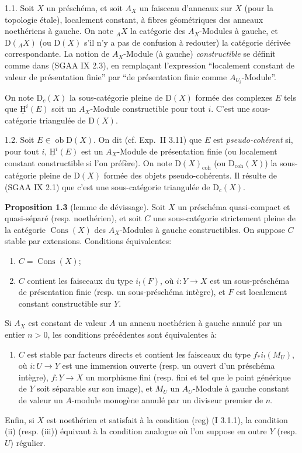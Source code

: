 \documentclass[11pt]{article}
\providecommand{\Cons}{\operatorname{Cons}}
\providecommand{\uH}{\underline{\mathrm H}}
\newcommand{\D}{\mathrm{D}}
\newcommand{\ob}{\operatorname{ob}}
\providecommand{\ob}{\operatorname{ob}}
\begin{document}
1.1. Soit $X$ un préschéma, et soit $A_X$ un faisceau d'anneaux sur $X$ (pour la topologie étale), localement constant, à fibres géométriques des anneaux noethériens à gauche. On note ${}_A X$ la catégorie des $A_X$-Modules à gauche, et $\D({}_A X)$ (ou $\D(X)$ s'il n'y a pas de confusion à redouter) la catégorie dérivée correspondante. La notion de $A_X$-Module (à gauche) \emph{constructible} se définit comme dans (SGAA IX 2.3), en remplaçant l'expression ``localement constant de valeur de présentation finie'' par ``de présentation finie comme $A_{U_i}$-Module''.

On note $\D_c(X)$ la sous-catégorie pleine de $\D(X)$ formée des complexes $E$ tels que $\uH^i(E)$ soit un $A_X$-Module constructible pour tout $i$. C'est une sous-catégorie triangulée de $\D(X)$.

1.2.
Soit $E\in\ob\D(X)$. On dit (cf. Exp.~II 3.11) que $E$ est \emph{pseudo-cohérent} si, pour tout $i$, $\uH^i(E)$ est un $A_X$-Module de présentation finie (ou localement constant constructible si l'on préfère). On note $\D(X)_{\mathrm{coh}}$ (ou $\D_{\mathrm{coh}}(X)$) la sous-catégorie pleine de $\D(X)$ formée des objets pseudo-cohérents. Il résulte de (SGAA IX 2.1) que c'est une sous-catégorie triangulée de $\D_c(X)$.

\textbf{Proposition 1.3} (lemme de dévissage). Soit $X$ un préschéma quasi-compact et quasi-séparé (resp. noethérien), et soit $C$ une sous-catégorie strictement pleine de la catégorie $\Cons(X)$ des $A_X$-Modules à gauche constructibles. On suppose $C$ stable par extensions. Conditions équivalentes:
\begin{enumerate}[label=(\roman*)]
\item $C=\Cons(X)$;
\item $C$ contient les faisceaux du type $i_!(F)$, où $i:Y\to X$ est un sous-préschéma de présentation finie (resp. un sous-préschéma intègre), et $F$ est localement constant constructible sur $Y$.
\end{enumerate}
Si $A_X$ est constant de valeur $A$ un anneau noethérien à gauche annulé par un entier $n>0$, les conditions précédentes sont équivalentes à:
\begin{enumerate}[label=(\roman*),start=3]
\item $C$ est stable par facteurs directs et contient les faisceaux du type $f_*i_!(M_U)$, où $i:U\to Y$ est une immersion ouverte (resp. un ouvert d'un préschéma intègre), $f:Y\to X$ un morphisme fini (resp. fini et tel que le point générique de $Y$ soit séparable sur son image), et $M_U$ un $A_U$-Module à gauche constant de valeur un $A$-module monogène annulé par un diviseur premier de $n$.
\end{enumerate}
Enfin, si $X$ est noethérien et satisfait à la condition (reg) (I 3.1.1), la condition (ii) (resp. (iii)) équivaut à la condition analogue 
où l'on
suppose en outre $Y$ (resp. $U$) régulier.
\end{document}
